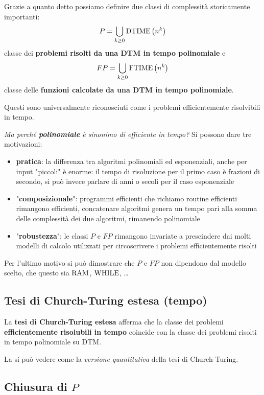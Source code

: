 Grazie a quanto detto possiamo definire due classi di complessità storicamente importanti: 
$$ P = \bigcup_{k \geq 0} \text{DTIME} \left(n^k\right) $$
classe dei \textbf{problemi risolti da una DTM in tempo polinomiale} e 
$$ FP = \bigcup_{k \geq 0} \text{FTIME} \left(n^k\right)$$
classe delle \textbf{funzioni calcolate da una DTM in tempo polinomiale}.

Questi sono universalmente riconosciuti come i problemi efficientemente risolvibili in tempo.

\textit{Ma perché \textbf{polinomiale} è sinonimo di efficiente in tempo?} Si possono dare tre motivazioni: 
\begin{itemize}
	\item \textbf{pratica}: la differenza tra algoritmi polinomiali ed esponenziali, anche per input "piccoli" è enorme: il tempo di risoluzione per il primo caso è frazioni di secondo, si può invece parlare di anni o secoli per il caso esponenziale
	\item "\textbf{composizionale}": programmi efficienti che richiamo routine efficienti rimangono efficienti, concatenare algoritmi genera un tempo pari alla somma delle complessità dei due algoritmi, rimanendo polinomiale 
	\item "\textbf{robustezza}": le classi $P$ e $FP$ rimangono invariate a prescindere dai molti modelli di calcolo utilizzati per circoscrivere i problemi efficientemente risolti 
\end{itemize}

Per l'ultimo motivo si può dimostrare che $P$ e $FP$ non dipendono dal modello scelto, che questo sia $\text{RAM}$, $\text{WHILE}$, \dots

\subsection{Tesi di Church-Turing estesa (tempo)}

La \textbf{tesi di Church-Turing estesa} afferma che la classe dei problemi \textbf{efficientemente risolubili in tempo} coincide con la classe dei problemi risolti in tempo polinomiale su DTM.

La si può vedere come la \textit{versione quantitativa} della tesi di Church-Turing. 

\subsection{Chiusura di $P$}

